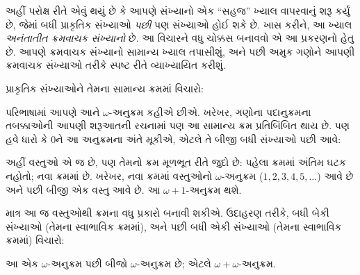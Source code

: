 અહીં પરોક્ષ રીતે એવું થયું છે કે આપણે સંખ્યાનો એક
“સહજ” ખ્યાલ વાપરવાનું શરૂ કર્યું છે, જેમાં બધી પ્રાકૃતિક
સંખ્યાઓ \emph{પછી} પણ સંખ્યાઓ હોઈ શકે છે. ખાસ કરીને,
આ ખ્યાલ \emph{અનંતાતીત ક્રમવાચક સંખ્યાનો} છે.
આ વિચારને વધુ ચોક્કસ બનાવવો એ આ પ્રકરણનો હેતુ છે.
આપણે ક્રમવાચક સંખ્યાનો સામાન્ય ખ્યાલ તપાસીશું, અને પછી
અમુક ગણોને આપણી ક્રમવાચક સંખ્યાઓ તરીકે સ્પષ્ટ રીતે
વ્યાખ્યાયિત કરીશું.
\endgroup

\begingroup
\makeatletter{}\makeatother

\label{guunit:OLP-0549}


પ્રાકૃતિક સંખ્યાઓને તેમના સામાન્ય ક્રમમાં વિચારો:
\begin{center}
\end{center}
પરિભાષામાં આપણે આને $\omega$-અનુક્રમ કહીએ છીએ.
ખરેખર, ગણોના પદાનુક્રમના તબક્કાઓની આપણી શરૂઆતની
રચનામાં પણ આ સામાન્ય ક્રમ પ્રતિબિંબિત થાય છે.
પણ હવે ધારો કે $0$ને આ અનુક્રમના અંતે મૂકીએ,
એટલે તે બીજી બધી સંખ્યાઓ પછી આવે:
\begin{center}
\end{center}
અહીં વસ્તુઓ એ જ છે, પણ તેમનો ક્રમ મૂળભૂત રીતે જુદો
છે: પહેલા ક્રમમાં અંતિમ ઘટક નહોતો; નવા ક્રમમાં છે.
ખરેખર, નવા ક્રમમાં વસ્તુઓનો $\omega$-અનુક્રમ
($1, 2, 3, 4, 5, \ldots$) આવે છે અને પછી બીજી
એક વસ્તુ આવે છે. આ $\omega+1$-અનુક્રમ થશે.

માત્ર આ જ વસ્તુઓથી ક્રમના વધુ પ્રકારો બનાવી શકીએ.
ઉદાહરણ તરીકે, બધી બેકી સંખ્યાઓ (તેમના સ્વાભાવિક
ક્રમમાં), અને પછી બધી એકી સંખ્યાઓ (તેમના સ્વાભાવિક
ક્રમમાં) વિચારો:
\begin{center}
\end{center}
આ એક $\omega$-અનુક્રમ પછી બીજો $\omega$-અનુક્રમ
છે; એટલે $\omega+\omega$-અનુક્રમ.

